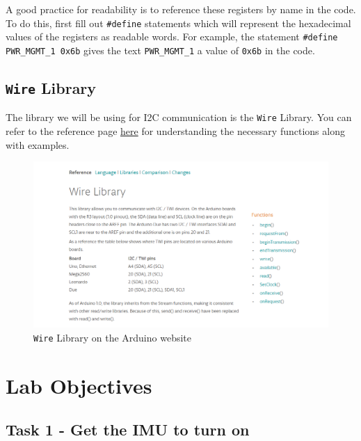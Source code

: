 \documentclass{article}
\begin{document}
        A good practice for readability is to reference these registers by name in the code. To do this, first fill out \texttt{\#define} statements which will represent the hexadecimal values of the registers as readable words. For example, the statement \texttt{\#define PWR\_MGMT\_1 0x6b} gives the text \texttt{PWR\_MGMT\_1} a value of \texttt{0x6b} in the code.  
        
    \subsection{\texttt{Wire} Library}
        The library we will be using for I2C communication is the \texttt{Wire} Library. You can refer to the reference page \href{https://www.arduino.cc/en/reference/wire}{here} for understanding the necessary functions along with examples.
        
        \begin{figure}[ht]
            \centering
            \includegraphics[width = 1.0\textwidth]{img/WireLibrary.PNG}
            \caption{\texttt{Wire} Library on the Arduino website}
        \end{figure}
        
\section{Lab Objectives}
    \subsection{Task 1 - Get the IMU to turn on}
\end{document}
